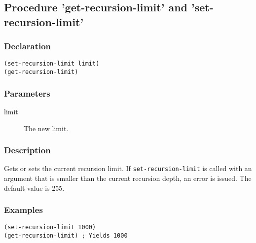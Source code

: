 \subsection{Procedure 'get-recursion-limit' and 'set-recursion-limit'}
\label{builtins/recursion-limit}

\subsubsection*{Declaration}
\begin{lstlisting}
(set-recursion-limit limit)
(get-recursion-limit)
\end{lstlisting}

\subsubsection*{Parameters}
\begin{description}
	\item[limit] The new limit.
\end{description}

\subsubsection*{Description}
Gets or sets the current recursion limit. If \lstinline|set-recursion-limit| is called with an argument that is smaller than the current recursion depth, an error is issued. The default value is 255.

\subsubsection*{Examples}
\begin{lstlisting}
(set-recursion-limit 1000)
(get-recursion-limit) ; Yields 1000
\end{lstlisting}
